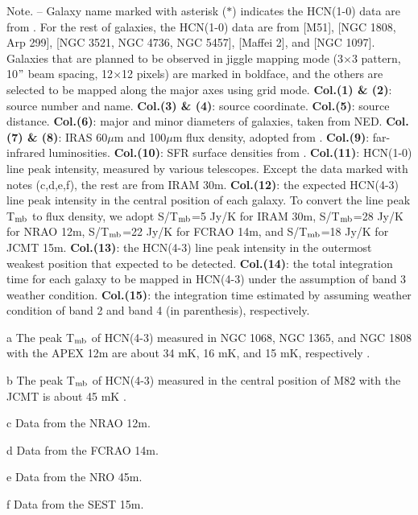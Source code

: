 \begin{table*}
\begin{threeparttable}[b]
\begin{tablenotes}
Note. -- Galaxy name marked with asterisk ($\ast$) indicates the HCN(1-0) data
are from \citet{gs04a}. For the rest of galaxies, the HCN(1-0) data are from
\citet{Chen15} [M51], \citet{Baan08} [NGC 1808, Arp 299], \citet{usero15} [NGC 3521, NGC 4736, NGC
5457], \citet{Nguyen1992} [Maffei 2], and \citet{Kohno2003} [NGC 1097].
Galaxies that are planned to be observed in jiggle mapping mode (3$\times$3
pattern, 10$"$ beam spacing, 12$\times$12 pixels) are marked in boldface, and
the others are selected to be mapped along the major axes using grid mode.
% 
{\bf Col.(1) \& (2)}: source number and name. {\bf Col.(3) \& (4)}: source coordinate. 
% 
{\bf Col.(5)}: source distance. 
% 
{\bf Col.(6)}: major and minor
diameters of galaxies, taken from NED. 
% 
{\bf Col.(7) \& (8)}:  IRAS 60$\mu$m and 100$\mu$m flux density, adopted from \citet{smk03}. 
% 
{\bf Col.(9)}: far-infrared luminosities. 
% 
{\bf Col.(10)}: SFR surface densities from \cite{lgg2015}. 
% 
{\bf Col.(11)}: HCN(1-0)
line peak intensity, measured by various telescopes. Except the data marked with notes (c,d,e,f), the rest are from IRAM 30m. 
% 
{\bf Col.(12)}: the expected HCN(4-3) line peak intensity in the central position of each galaxy. To convert the line peak T$_{\rm mb}$ to flux density, we adopt S/T$_{\rm mb}$=5 Jy/K for IRAM 30m, S/T$_{\rm mb}$=28 Jy/K for NRAO 12m, S/T$_{\rm mb}$=22 Jy/K for FCRAO
14m, and S/T$_{\rm mb}$=18 Jy/K for JCMT 15m. 
% 
{\bf Col.(13)}: the HCN(4-3) line peak intensity in the outermost weakest position that expected to be detected.
% 
{\bf Col.(14)}: the total integration time for each galaxy to be mapped in HCN(4-3) under the assumption of band 3 weather condition.
% 
{\bf Col.(15)}: the integration time estimated 
by assuming weather condition of band 2 and band 4 (in parenthesis), respectively. \\

\item[a]{The peak T$_{\rm mb}$ of HCN(4-3) measured in NGC 1068, NGC 1365, and NGC 1808 with the APEX 12m are about 34 mK, 16 mK, and 15 mK, respectively \citep{zgh2014}.}
\item[b]{The peak T$_{\rm mb}$ of HCN(4-3) measured in the central position of M82 with the JCMT is about 45 mK \citep{Seaquist2000}.}
\item[c]{Data from the NRAO 12m.}
\item[d]{Data from the FCRAO 14m.}
\item[e]{Data from the NRO 45m.}
\item[f]{Data from the SEST 15m.}

\end{tablenotes}
\end{threeparttable}

\end{table*}

